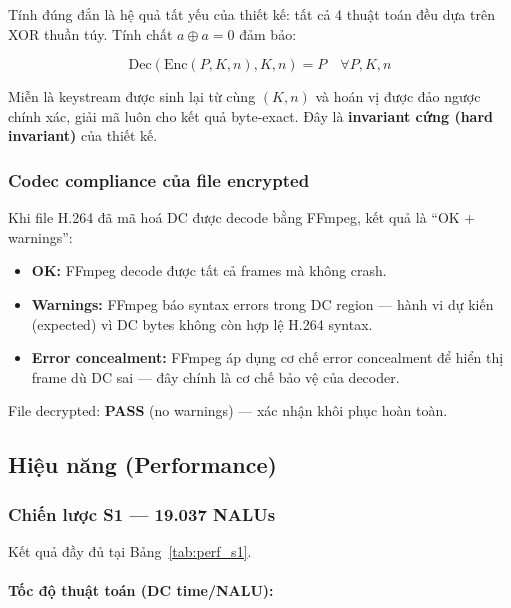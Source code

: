 Tính đúng đắn là hệ quả tất yếu của thiết kế: tất cả 4 thuật toán đều dựa trên
XOR thuần túy. Tính chất $a \oplus a = 0$ đảm bảo:

\begin{equation}
\text{Dec}(\text{Enc}(P, K, n), K, n) = P \quad \forall P, K, n
\end{equation}

Miễn là keystream được sinh lại từ cùng $(K, n)$ và hoán vị được đảo ngược chính xác,
giải mã luôn cho kết quả byte-exact. Đây là \textbf{invariant cứng (hard invariant)}
của thiết kế.

\subsubsection{Codec compliance của file encrypted}

Khi file H.264 đã mã hoá DC được decode bằng FFmpeg, kết quả là ``OK + warnings'':
\begin{itemize}
  \item \textbf{OK:} FFmpeg decode được tất cả frames mà không crash.
  \item \textbf{Warnings:} FFmpeg báo syntax errors trong DC region --- hành vi
        dự kiến (expected) vì DC bytes không còn hợp lệ H.264 syntax.
  \item \textbf{Error concealment:} FFmpeg áp dụng cơ chế error concealment
        để hiển thị frame dù DC sai --- đây chính là cơ chế bảo vệ của decoder.
\end{itemize}

File decrypted: \textbf{PASS} (no warnings) --- xác nhận khôi phục hoàn toàn.

\subsection{Hiệu năng (Performance)}

\subsubsection{Chiến lược S1 --- 19.037 NALUs}

Kết quả đầy đủ tại Bảng~\ref{tab:perf_s1}.

\paragraph{Tốc độ thuật toán (DC time/NALU):}


